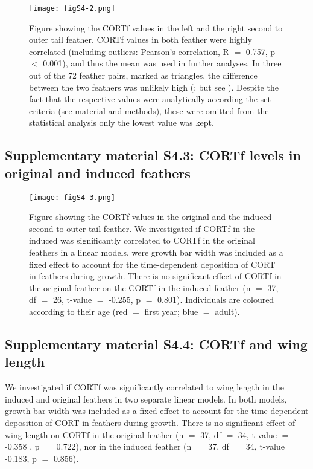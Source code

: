 \documentclass[10pt, twoside]{book} %
\begin{document}
\begin{figure}[h!]
	\begin{center}
		\texttt{[image: figS4-2.png]}
	\end{center}
	\caption*{Figure showing the CORTf values in the left and the right second to outer tail feather. CORTf values in both feather were highly correlated (including outliers: Pearson's correlation, R $=$ 0.757, p $<$ 0.001), and thus the mean was used in further analyses. In three out of the 72 feather pairs, marked as triangles, the difference between the two feathers was unlikely high (\citealt{Aharon-Rotman2017, Lattin2011}; but see \citealt{Harris2016}). Despite the fact that the respective values were analytically according the set criteria (see material and methods), these were omitted from the statistical analysis only the lowest value was kept.}
\end{figure}

\clearpage
	\subsection*{Supplementary material S4.3: CORTf levels in original and induced feathers}
	
	\begin{figure}[h!]
		\begin{center}
			\texttt{[image: figS4-3.png]}
		\end{center}
		\caption*{Figure showing the CORTf values in the original and the induced second to outer tail feather. We investigated if CORTf in the induced was significantly correlated to CORTf in the original feathers in a linear models, were growth bar width was included as a fixed effect to account for the time-dependent deposition of CORT in feathers during growth. There is no significant effect of CORTf in the original feather on the CORTf in the induced feather (n $=$ 37, df $=$ 26, t-value $=$ -0.255, p $=$ 0.801). Individuals are coloured according to their age (red $=$ first year; blue $=$ adult).}
	\end{figure}

\clearpage
	\subsection*{Supplementary material S4.4: CORTf and wing length}
	
	We investigated if CORTf was significantly correlated to wing length in the induced and original feathers in two separate linear models. In both models, growth bar width was included as a fixed effect to account for the time-dependent deposition of CORT in feathers during growth. There is no significant effect of wing length on CORTf in the original feather (n $=$ 37, df $=$ 34, t-value $=$ -0.358 , p $=$ 0.722), nor in the induced feather (n $=$ 37, df $=$ 34, t-value $=$ -0.183, p $=$ 0.856).\\
	
\end{document}
